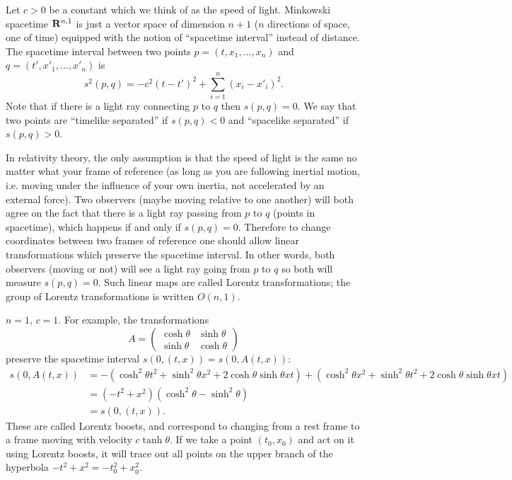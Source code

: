 \documentclass[12pt]{article}
\begin{document}
\begin{dfn}
  Let $c>0$ be a constant which we think of as the speed of light. Minkowski spacetime $\mathbf{R}^{n,1}$ is just a vector space of dimension $n+1$ ($n$ directions of space, one of time) equipped with the notion of ``spacetime interval'' instead of distance. The spacetime interval between two points $p=(t,x_1,\ldots,x_n)$ and $q=(t',x'_1,\ldots,x'_n)$ is
  \[s^2(p,q)=-c^2(t-t')^2+\sum_{i=1}^n(x_i-x'_i)^2.\]
  Note that if there is a light ray connecting $p$ to $q$ then $s(p,q)=0$. We say that two points are ``timelike separated'' if $s(p,q)<0$ and ``spacelike separated'' if $s(p,q)>0$.
\end{dfn}

In relativity theory, the only assumption is that the speed of light is the same no matter what your frame of reference (as long as you are following inertial motion, i.e. moving under the influence of your own inertia, not accelerated by an external force). Two observers (maybe moving relative to one another) will both agree on the fact that there is a light ray passing from $p$ to $q$ (points in spacetime), which happens if and only if $s(p,q)=0$. Therefore to change coordinates between two frames of reference one should allow linear transformations which preserve the spacetime interval. In other words, both observers (moving or not) will see a light ray going from $p$ to $q$ so both will measure $s(p,q)=0$. Such linear maps are called Lorentz transformations; the group of Lorentz transformations is written $O(n,1)$.

\begin{exm}
  $n=1$, $c=1$. For example, the transformations
  \[A=\left(\begin{array}{cc}\cosh\theta&\sinh\theta\\\sinh\theta&\cosh\theta\end{array}\right)\]
    preserve the spacetime interval $s(0,(t,x))=s(0,A(t,x))$:
    \begin{align*}
      s(0,A(t,x))&=-(\cosh^2\theta t^2+\sinh^2\theta x^2+2\cosh\theta\sinh\theta xt)+(\cosh^2\theta x^2+\sinh^2\theta t^2+2\cosh\theta\sinh\theta xt)\\
&=(-t^2+x^2)(\cosh^2\theta-\sinh^2\theta)\\
&=s(0,(t,x)).\end{align*}
    These are called Lorentz boosts, and correspond to changing from a rest frame to a frame moving with velocity $c\tanh\theta$. If we take a point $(t_0,x_0)$ and act on it using Lorentz boosts, it will trace out all points on the upper branch of the hyperbola $-t^2+x^2=-t_0^2+x_0^2$.
\end{exm}
\end{document}
